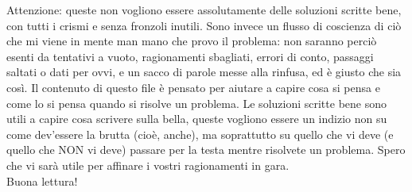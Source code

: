 Attenzione: queste non vogliono essere assolutamente delle soluzioni scritte bene, con tutti i crismi e senza fronzoli inutili. Sono invece un flusso di coscienza di ciò che mi viene in mente man mano che provo il problema: non saranno perciò esenti da tentativi a vuoto, ragionamenti sbagliati, errori di conto, passaggi saltati o dati per ovvi, e un sacco di parole messe alla rinfusa, ed è giusto che sia così. Il contenuto di questo file è pensato per aiutare a capire cosa si pensa e come lo si pensa quando si risolve un problema. Le soluzioni scritte bene sono utili a capire cosa scrivere sulla bella, queste vogliono essere un indizio non su come dev'essere la brutta (cioè, anche), ma soprattutto su quello che vi deve (e quello che NON vi deve) passare per la testa mentre risolvete un problema. Spero che vi sarà utile per affinare i vostri ragionamenti in gara. \\
Buona lettura!

